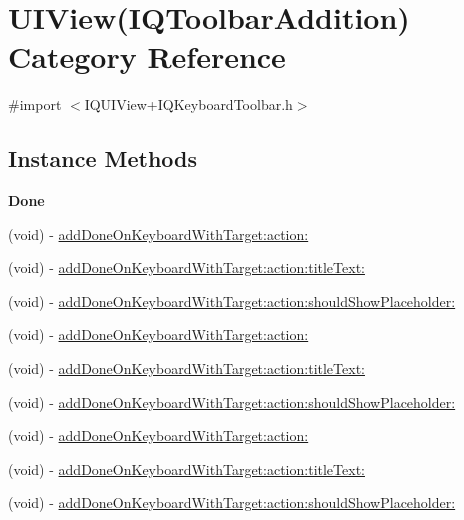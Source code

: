 \hypertarget{category_u_i_view_07_i_q_toolbar_addition_08}{}\section{U\+I\+View(I\+Q\+Toolbar\+Addition) Category Reference}
\label{category_u_i_view_07_i_q_toolbar_addition_08}


{\ttfamily \#import $<$I\+Q\+U\+I\+View+\+I\+Q\+Keyboard\+Toolbar.\+h$>$}

\subsection*{Instance Methods}
\begin{Indent}\textbf{ Done}\par
{\em 

 

 }\begin{DoxyCompactItemize}
\item 
(void) -\/ \mbox{\hyperlink{category_u_i_view_07_i_q_toolbar_addition_08_a8c336246bb1305d5c6deb01df86739aa}{add\+Done\+On\+Keyboard\+With\+Target\+:action\+:}}
\item 
(void) -\/ \mbox{\hyperlink{category_u_i_view_07_i_q_toolbar_addition_08_aa22d2729f2b939fb12303f1faef63328}{add\+Done\+On\+Keyboard\+With\+Target\+:action\+:title\+Text\+:}}
\item 
(void) -\/ \mbox{\hyperlink{category_u_i_view_07_i_q_toolbar_addition_08_a4207824aee8c3668663e30906ed55f56}{add\+Done\+On\+Keyboard\+With\+Target\+:action\+:should\+Show\+Placeholder\+:}}
\item 
(void) -\/ \mbox{\hyperlink{category_u_i_view_07_i_q_toolbar_addition_08_a8c336246bb1305d5c6deb01df86739aa}{add\+Done\+On\+Keyboard\+With\+Target\+:action\+:}}
\item 
(void) -\/ \mbox{\hyperlink{category_u_i_view_07_i_q_toolbar_addition_08_aa22d2729f2b939fb12303f1faef63328}{add\+Done\+On\+Keyboard\+With\+Target\+:action\+:title\+Text\+:}}
\item 
(void) -\/ \mbox{\hyperlink{category_u_i_view_07_i_q_toolbar_addition_08_a4207824aee8c3668663e30906ed55f56}{add\+Done\+On\+Keyboard\+With\+Target\+:action\+:should\+Show\+Placeholder\+:}}
\item 
(void) -\/ \mbox{\hyperlink{category_u_i_view_07_i_q_toolbar_addition_08_a8c336246bb1305d5c6deb01df86739aa}{add\+Done\+On\+Keyboard\+With\+Target\+:action\+:}}
\item 
(void) -\/ \mbox{\hyperlink{category_u_i_view_07_i_q_toolbar_addition_08_aa22d2729f2b939fb12303f1faef63328}{add\+Done\+On\+Keyboard\+With\+Target\+:action\+:title\+Text\+:}}
\item 
(void) -\/ \mbox{\hyperlink{category_u_i_view_07_i_q_toolbar_addition_08_a4207824aee8c3668663e30906ed55f56}{add\+Done\+On\+Keyboard\+With\+Target\+:action\+:should\+Show\+Placeholder\+:}}
\end{DoxyCompactItemize}
\end{Indent}
